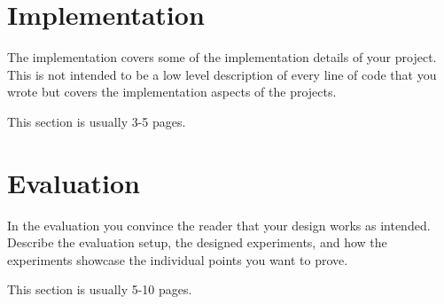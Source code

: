 \documentclass[a4paper,11pt,oneside]{report}
\begin{document}




\chapter{Implementation}

The implementation covers some of the implementation details of your project.
This is not intended to be a low level description of every line of code that
you wrote but covers the implementation aspects of the projects.

This section is usually 3-5 pages.






\chapter{Evaluation}

In the evaluation you convince the reader that your design works as intended.
Describe the evaluation setup, the designed experiments, and how the
experiments showcase the individual points you want to prove.

This section is usually 5-10 pages.




\end{document}
